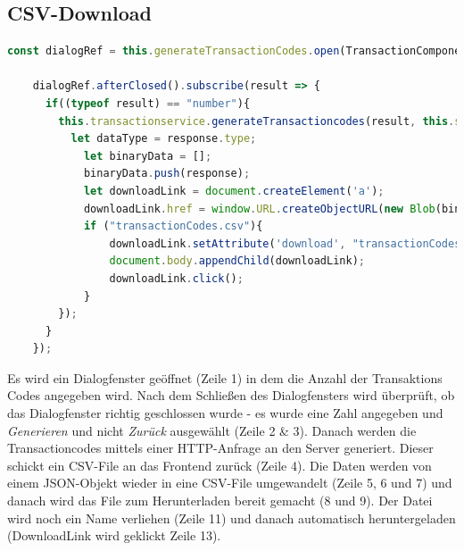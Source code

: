\subsection{CSV-Download}
\begin{lstlisting}[language=TypeScript, caption=CSV-Download, label=lst:CSV-Download]
    const dialogRef = this.generateTransactionCodes.open(TransactionComponent,{width:"30%"});

    dialogRef.afterClosed().subscribe(result => {
      if((typeof result) == "number"){
        this.transactionservice.generateTransactioncodes(result, this.survey.id).subscribe((response : any)=>{
          let dataType = response.type;
            let binaryData = [];
            binaryData.push(response);
            let downloadLink = document.createElement('a');
            downloadLink.href = window.URL.createObjectURL(new Blob(binaryData, {type: dataType}));
            if ("transactionCodes.csv"){
                downloadLink.setAttribute('download', "transactionCodes_" + this.survey.title + ".csv");
                document.body.appendChild(downloadLink);
                downloadLink.click();
            }
        });
      }
    });
\end{lstlisting}
Es wird ein Dialogfenster geöffnet (Zeile 1) in dem die Anzahl der Transaktions Codes angegeben wird. Nach dem Schließen des 
Dialogfensters wird überprüft, ob das Dialogfenster \dq richtig \dq geschlossen wurde - es wurde eine Zahl angegeben 
und \textit{Generieren} und nicht \textit{Zurück} ausgewählt (Zeile 2 \& 3). Danach werden die Transactioncodes mittels 
einer HTTP-Anfrage an den Server generiert. Dieser schickt ein CSV-File an das Frontend zurück (Zeile 4). 
Die Daten werden von einem JSON-Objekt wieder in eine CSV-File umgewandelt (Zeile 5, 6 und 7) und danach wird das File 
zum Herunterladen bereit gemacht (8 und 9). Der Datei wird noch ein Name verliehen (Zeile 11) und danach automatisch heruntergeladen (DownloadLink wird geklickt Zeile 13).

